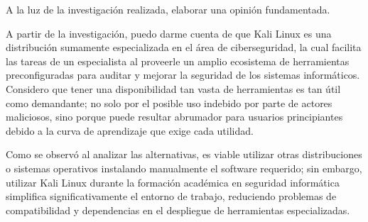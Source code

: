 A la luz de la investigación realizada, elaborar una opinión fundamentada.

A partir de la investigación, puedo darme cuenta de que Kali Linux es una distribución sumamente especializada en el área de ciberseguridad, la cual facilita las tareas de un especialista al proveerle un amplio ecosistema de herramientas preconfiguradas para auditar y mejorar la seguridad de los sistemas informáticos. Considero que tener una disponibilidad tan vasta de herramientas es tan útil como demandante; no solo por el posible uso indebido por parte de actores maliciosos, sino porque puede resultar abrumador para usuarios principiantes debido a la curva de aprendizaje que exige cada utilidad.

Como se observó al analizar las alternativas, es viable utilizar otras distribuciones o sistemas operativos instalando manualmente el software requerido; sin embargo, utilizar Kali Linux durante la formación académica en seguridad informática simplifica significativamente el entorno de trabajo, reduciendo problemas de compatibilidad y dependencias en el despliegue de herramientas especializadas.
